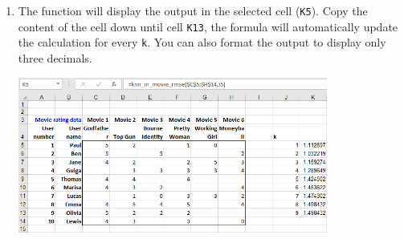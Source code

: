 \documentclass[12pt]{article}
\begin{document}
\begin{enumerate}
\medskip

\item The function will display the output in the selected cell (\texttt{K5}). Copy the content of the cell down until cell \texttt{K13}, the formula will automatically update the calculation for every \texttt{k}. You can also format the output to display only three decimals.
\medskip

\centerline{\includegraphics[width=4in]{figures/knninmoviermse3}}

\medskip
\end{enumerate}








\end{document}
